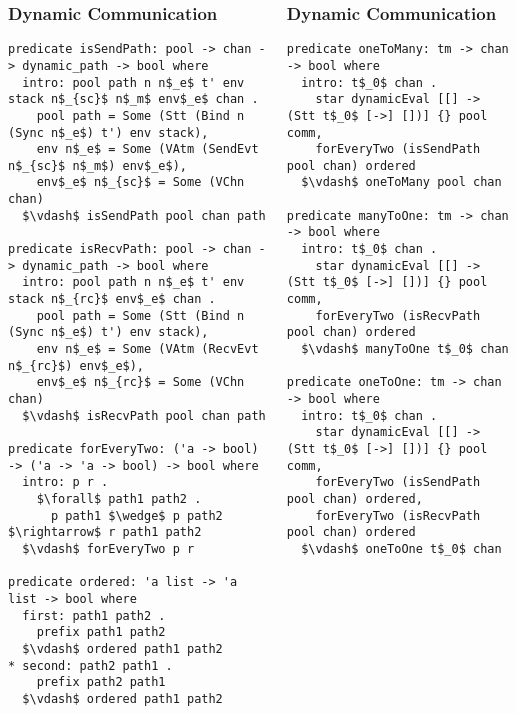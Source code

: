 \documentclass{beamer}
\begin{document}
\begin{frame}[fragile]
\begin{columns}
\begin{frame}[fragile]
	\frametitle{Dynamic Communication}
\begin{lstlisting}[language=logic, mathescape]
predicate isSendPath: pool -> chan -> dynamic_path -> bool where
  intro: pool path n n$_e$ t' env stack n$_{sc}$ n$_m$ env$_e$ chan .
    pool path = Some (Stt (Bind n (Sync n$_e$) t') env stack),
    env n$_e$ = Some (VAtm (SendEvt n$_{sc}$ n$_m$) env$_e$), 
    env$_e$ n$_{sc}$ = Some (VChn chan)
  $\vdash$ isSendPath pool chan path

predicate isRecvPath: pool -> chan -> dynamic_path -> bool where
  intro: pool path n n$_e$ t' env stack n$_{rc}$ env$_e$ chan .
    pool path = Some (Stt (Bind n (Sync n$_e$) t') env stack),
    env n$_e$ = Some (VAtm (RecvEvt n$_{rc}$) env$_e$),
    env$_e$ n$_{rc}$ = Some (VChn chan)
  $\vdash$ isRecvPath pool chan path

predicate forEveryTwo: ('a -> bool) -> ('a -> 'a -> bool) -> bool where
  intro: p r .
    $\forall$ path1 path2 .
      p path1 $\wedge$ p path2 $\rightarrow$ r path1 path2
  $\vdash$ forEveryTwo p r

predicate ordered: 'a list -> 'a list -> bool where
  first: path1 path2 .
    prefix path1 path2
  $\vdash$ ordered path1 path2
* second: path2 path1 .
    prefix path2 path1
  $\vdash$ ordered path1 path2
\end{lstlisting}
\end{frame}

\begin{frame}[fragile]
	\frametitle{Dynamic Communication}
\begin{lstlisting}[language=logic, mathescape]
predicate oneToMany: tm -> chan -> bool where
  intro: t$_0$ chan .
    star dynamicEval [[] -> (Stt t$_0$ [->] [])] {} pool comm,
    forEveryTwo (isSendPath pool chan) ordered
  $\vdash$ oneToMany pool chan

predicate manyToOne: tm -> chan -> bool where
  intro: t$_0$ chan .
    star dynamicEval [[] -> (Stt t$_0$ [->] [])] {} pool comm,
    forEveryTwo (isRecvPath pool chan) ordered
  $\vdash$ manyToOne t$_0$ chan

predicate oneToOne: tm -> chan -> bool where
  intro: t$_0$ chan .
    star dynamicEval [[] -> (Stt t$_0$ [->] [])] {} pool comm,
    forEveryTwo (isSendPath pool chan) ordered,
    forEveryTwo (isRecvPath pool chan) ordered
  $\vdash$ oneToOne t$_0$ chan

\end{lstlisting}
\end{frame}


\end{columns}
\end{frame}
\end{document}
